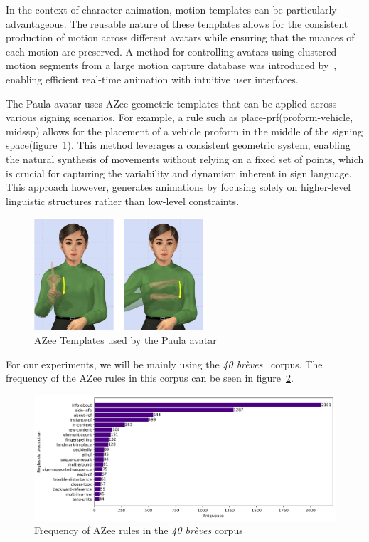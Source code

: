 \documentclass[../../main.tex]{subfiles}
\begin{document}
In the context of character animation, motion templates can be particularly advantageous. The reusable nature of these templates allows for the consistent production of motion across different avatars while ensuring that the nuances of each motion are preserved. A method for controlling avatars using clustered motion segments from a large motion capture database was introduced by~\cite{10.1145/566654.566607}, enabling efficient real-time animation with intuitive user interfaces.

The Paula avatar uses AZee geometric templates that can be applied across various signing scenarios. For example, a rule such as place-prf(proform-vehicle, midssp) allows for the placement of a vehicle proform in the middle of the signing space(figure~\ref{fig:azee_template_example}). This method leverages a consistent geometric system, enabling the natural synthesis of movements without relying on a fixed set of points, which is crucial for capturing the variability and dynamism inherent in sign language. This approach however, generates animations by focusing solely on higher-level linguistic structures rather than low-level constraints.

\begin{figure}
    \centering \includegraphics[width = 2.5in]{chapters/intermediate_blocks/images/azee_template_example.png}
    \caption{AZee Templates used by the Paula avatar}
    \label{fig:azee_template_example}
\end{figure}

For our experiments, we will be mainly using the \emph{40 brèves}~\cite{challant2022first} corpus. The frequency of the AZee rules in this corpus can be seen in figure~\ref{fig:azee_rule_frequency}.

\begin{figure}
    \centering \includegraphics[width = 5in]{chapters/intermediate_blocks/images/azee_rule_frequency.png}
    \caption{Frequency of AZee rules in the \emph{40 brèves} corpus}
    \label{fig:azee_rule_frequency}
\end{figure}
\end{document}
